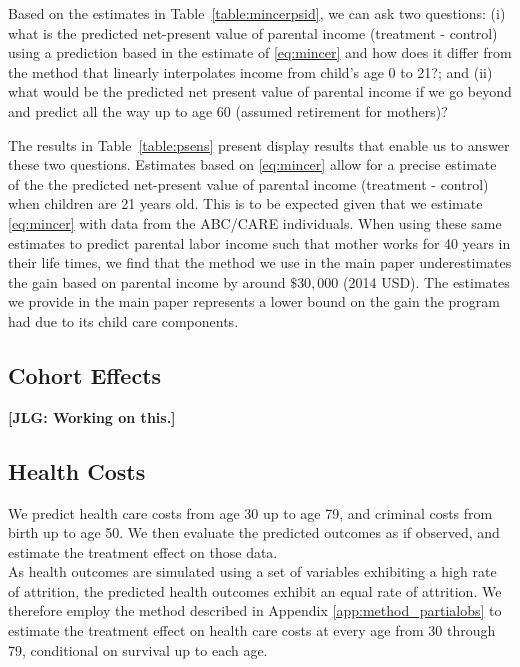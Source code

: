 \noindent Based on the estimates in Table~\ref{table:mincerpsid}, we can ask two questions: (i) what is the predicted net-present value of parental income (treatment - control) using a prediction based in the estimate of \eqref{eq:mincer} and how does it differ from the method that linearly interpolates income from child's age 0 to 21?; and (ii) what would be the predicted net present value of parental income if we go beyond and predict all the way up to age 60 (assumed retirement for mothers)?

\noindent The results in Table~\ref{table:psens} present display results that enable us to answer these two questions. Estimates based on \eqref{eq:mincer} allow for a precise estimate of the the predicted net-present value of parental income (treatment - control) when children are 21 years old. This is to be expected given that we estimate \eqref{eq:mincer} with data from the ABC/CARE individuals. When using these same estimates to predict parental labor income such that mother works for 40 years in their life times, we find that the method we use in the main paper underestimates the gain based on parental income by around $\$30,000$ (2014 USD). The estimates we provide in the main paper represents a lower bound on the gain the program had due to its child care components.

\subsection{Cohort Effects}\label{app:cohorteffects}

\textbf{[JLG: Working on this.]}

\subsection{Health Costs}

\noindent We predict health care costs from age 30 up to age 79, and criminal costs from birth
up to age 50. We then evaluate the predicted outcomes as if observed, and estimate the
treatment effect on those data.\\

\noindent As health outcomes are simulated using a set of variables exhibiting a high rate of attrition, the
predicted health outcomes exhibit an equal rate of attrition. We therefore employ the method described
in Appendix \ref{app:method_partialobs} to estimate the treatment effect on health care costs at
every age from 30 through 79, conditional on survival up to each age. \\

